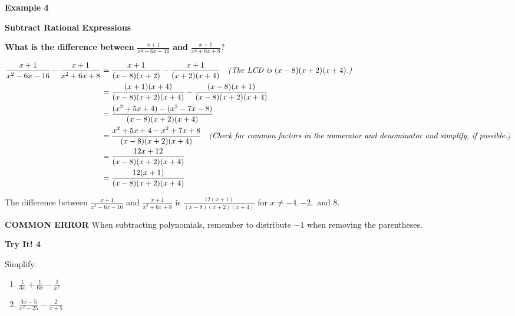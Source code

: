 \documentclass{article}
\newenvironment{concept-box}{}{}
\newenvironment{example}[1]{\textbf{Example #1}\par}{\par}
\newenvironment{tryit}[1]{\textbf{Try It! #1}\par}{\par}
\begin{document}
\begin{example}{4}
\textbf{Subtract Rational Expressions}

\textbf{What is the difference between} $\frac{x + 1}{x^2 - 6x - 16}$ \textbf{and} $\frac{x + 1}{x^2 + 6x + 8}$?

\begin{align*}
\frac{x + 1}{x^2 - 6x - 16} - \frac{x + 1}{x^2 + 6x + 8} &= \frac{x + 1}{(x - 8)(x + 2)} - \frac{x + 1}{(x + 2)(x + 4)} \quad \text{\textit{(The LCD is $(x - 8)(x + 2)(x + 4)$.)}} \\
&= \frac{(x + 1)(x + 4)}{(x - 8)(x + 2)(x + 4)} - \frac{(x - 8)(x + 1)}{(x - 8)(x + 2)(x + 4)} \\
&= \frac{(x^2 + 5x + 4) - (x^2 - 7x - 8)}{(x - 8)(x + 2)(x + 4)} \\
&= \frac{x^2 + 5x + 4 - x^2 + 7x + 8}{(x - 8)(x + 2)(x + 4)} \quad \text{\textit{(Check for common factors in the numerator and denominator and simplify, if possible.)}} \\
&= \frac{12x + 12}{(x - 8)(x + 2)(x + 4)} \\
&= \frac{12(x + 1)}{(x - 8)(x + 2)(x + 4)}
\end{align*}

The difference between $\frac{x + 1}{x^2 - 6x - 16}$ and $\frac{x + 1}{x^2 + 6x + 8}$ is $\frac{12(x + 1)}{(x - 8)(x + 2)(x + 4)}$ for $x \neq -4, -2, \text{ and } 8$.
\end{example}

\begin{concept-box}
\textbf{COMMON ERROR}
When subtracting polynomials, remember to distribute $-1$ when removing the parentheses.
\end{concept-box}

\begin{tryit}{4}
Simplify.
\begin{enumerate}
    \item[\textbf{a.}] $\frac{1}{3x} + \frac{1}{6x} - \frac{1}{x^2}$
    \item[\textbf{b.}] $\frac{3x - 5}{x^2 - 25} - \frac{2}{x + 5}$
\end{enumerate}
\end{tryit}
\end{document}
